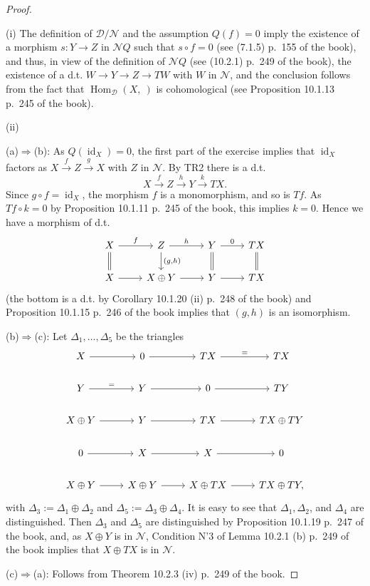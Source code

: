 \documentclass[12pt]{article}
\theoremstyle{remark}
\theoremstyle{definition}
\newcommand{\nn}{\noindent}
\newcommand{\cc}{\mathcal}
\newcommand{\then}{\Rightarrow}
\newcommand{\xr}{\xrightarrow}
\DeclareMathOperator{\id}{id}
\DeclareMathOperator{\Hom}{Hom}
\begin{document}
\begin{proof}\ 

\nn(i) The definition of $\cc D/\cc N$ and the assumption $Q(f)=0$ imply the existence of a morphism $s:Y\to Z$ in $\cc NQ$ such that $s\circ f=0$ (see (7.1.5) p.~155 of the book), and thus, in view of the definition of $\cc NQ$ (see (10.2.1) p.~249 of the book), the existence of a d.t. $W\to Y\to Z\to TW$ with $W$ in $\cc N$, and the conclusion follows from the fact that $\Hom_{\cc D}(X,\ )$ is cohomological (see Proposition 10.1.13 p.~245 of the book). 

\nn(ii)

\nn(a)$\then$(b): As $Q(\id_X)=0$, the first part of the exercise implies that $\id_X$ factors as $X\xr fZ\xr g X$ with $Z$ in $\cc N$. By TR2 there is a d.t. 
$$
X\xr fZ\xr hY\xr kTX.
$$ 
Since $g\circ f=\id_X$, the morphism $f$ is a monomorphism, and so is $Tf$. As $Tf\circ k=0$ by Proposition 10.1.11 p.~245 of the book, this implies $k=0$. Hence we have a morphism of d.t. 
$$
\begin{tikzcd}
X\ar[equal]{d}\ar{r}{f}&Z\ar{d}{(g,h)}\ar{r}{h}&Y\ar[equal]{d}\ar{r}{0}&TX\ar[equal]{d}\\ 
X\ar{r}&X\oplus Y\ar{r}&Y\ar{r}&TX
\end{tikzcd}
$$
(the bottom is a d.t. by Corollary 10.1.20 (ii) p.~248 of the book) and Proposition 10.1.15 p.~246 of the book implies that $(g,h)$ is an isomorphism.\bigskip 

\nn(b)$\then$(c): Let $\Delta_1,\dots,\Delta_5$ be the triangles
$$
\begin{tikzcd}
X\ar{r}&0\ar{r}&TX\ar{r}{=}&TX\\ 
Y\ar{r}{=}&Y\ar{r}&0\ar{r}&TY\\ 
X\oplus Y\ar{r}&Y\ar{r}&TX\ar{r}&TX\oplus TY\\ 
0\ar{r}&X\ar{r}&X\ar{r}&0\\ 
X\oplus Y\ar{r}&X\oplus Y\ar{r}&X\oplus TX\ar{r}&TX\oplus TY,
\end{tikzcd}
$$ 
with $\Delta_3:=\Delta_1\oplus\Delta_2$ and $\Delta_5:=\Delta_3\oplus\Delta_4$. It is easy to see that $\Delta_1,\Delta_2$, and $\Delta_4$ are distinguished. Then $\Delta_3$ and $\Delta_5$ are distinguished by Proposition 10.1.19 p.~247 of the book, and, as $X\oplus Y$ is in $\cc N$, Condition N'3 of Lemma 10.2.1 (b) p.~249 of the book implies that $X\oplus TX$ is in $\cc N$.

\nn(c)$\then$(a): Follows from Theorem 10.2.3 (iv) p.~249 of the book.
\end{proof} 
\end{document}
